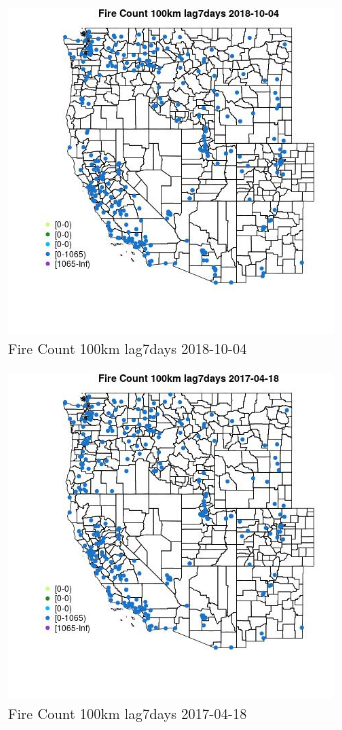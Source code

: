 \begin{figure} 
\centering  
\includegraphics[width=0.77\textwidth]{Code_Outputs/Report_ML_input_PM25_Step4_part_f_de_duplicated_aveswNAs_MapObsFire_Count_100km_lag7days2018-10-04.jpg} 
\caption{\label{fig:Report_ML_input_PM25_Step4_part_f_de_duplicated_aveswNAsMapObsFire_Count_100km_lag7days2018-10-04}Fire Count 100km lag7days 2018-10-04} 
\end{figure} 
 

\begin{figure} 
\centering  
\includegraphics[width=0.77\textwidth]{Code_Outputs/Report_ML_input_PM25_Step4_part_f_de_duplicated_aveswNAs_MapObsFire_Count_100km_lag7days2017-04-18.jpg} 
\caption{\label{fig:Report_ML_input_PM25_Step4_part_f_de_duplicated_aveswNAsMapObsFire_Count_100km_lag7days2017-04-18}Fire Count 100km lag7days 2017-04-18} 
\end{figure} 
 

